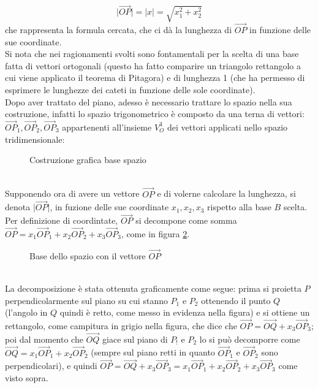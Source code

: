 \documentclass{book}
\newcommand{\abs}[1]{\lvert#1\rvert}
\theoremstyle{definition}
\theoremstyle{plain}
\begin{document}
\begin{equation}
  \label{eq:teoremadiPitapplicatoaAbsOP}
  \abs{\vec{OP}}=\abs{x}=\sqrt{x_1^2+x_2^2}
\end{equation}
che rappresenta la formula cercata, che ci dà la lunghezza di $\vec{OP}$ in funzione delle sue coordinate.\\
Si nota che nei ragionamenti svolti sono fontamentali per la scelta di una base fatta di vettori ortogonali (questo ha fatto comparire un triangolo rettangolo a cui viene applicato il teorema di Pitagora) e di lunghezza 1 (che ha permesso di esprimere le lunghezze dei cateti in funzione delle sole coordinate). \\
Dopo aver trattato del piano, adesso è necessario trattare lo spazio nella sua costruzione, infatti lo spazio trigonometrico è composto da una terna di vettori: $\vec{OP}_1,\vec{OP}_2,\vec{OP}_3$ appartenenti all'insieme $V_O^3$ dei vettori applicati nello spazio tridimensionale:
\begin{figure}[ht!]
  \centering
    \resizebox{4cm}{!}{
      
    }
  \caption{Costruzione grafica base spazio}
  \label{fig:costbasespazio}
\end{figure}\\
Supponendo ora di avere un vettore $\vec{OP}$ e di volerne calcolare la lunghezza, si denota $\abs{\vec{OP}}$, in fuzione delle sue coordinate $x_1,x_2,x_3$ rispetto alla base $B$ scelta. Per definizione di coordintate, $\vec{OP}$ si decompone come somma $\vec{OP}=x_1\vec{OP}_1+x_2\vec{OP}_2+x_3\vec{OP}_3$, come in figura \ref{fig:basedelspazioConVettOP}.
\begin{figure}[ht!]
  \centering
  \resizebox{4cm}{!}{
      
    }
  \caption{Base dello spazio con il vettore $\vec{OP}$}
  \label{fig:basedelspazioConVettOP}
\end{figure}\\
La decomposizione è stata ottenuta graficamente come segue: prima si proietta $P$ perpendicolarmente sul piano su cui stanno $P_1$ e $P_2$ ottenendo il punto $Q$ (l'angolo in $Q$ quindi è retto, come messo in evidenza nella figura) e si ottiene un rettangolo, come campitura in grigio nella figura, che dice che $\vec{OP}=\vec{OQ}+x_3\vec{OP}_3$; poi dal momento che $\vec{OQ}$ giace sul piano di $P_!$ e $P_2$ lo si può decomporre come $\vec{OQ}=x_1\vec{OP}_1+x_2\vec{OP}_2$ (sempre sul piano retti in quanto $\vec{OP}_1$ e $\vec{OP}_2$ sono perpendicolari), e quindi $\vec{OP}=\vec{OQ}+x_3\vec{OP}_3=x_1\vec{OP}_1+x_2\vec{OP}_2+x_3\vec{OP}_3$ come visto sopra.\\
\end{document}
